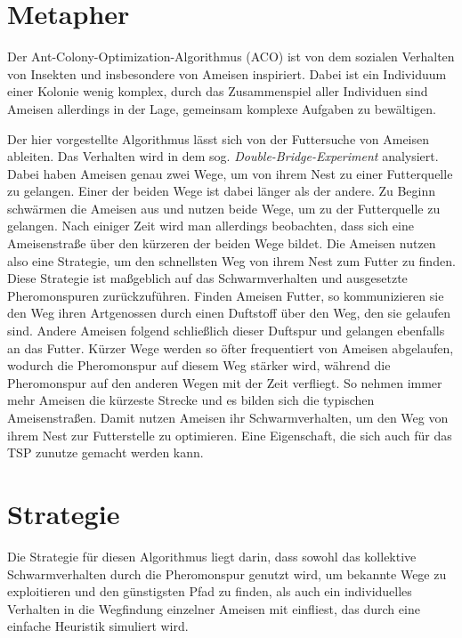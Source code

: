 
\section{Metapher}

Der Ant-Colony-Optimization-Algorithmus (ACO) ist von dem sozialen Verhalten
von Insekten und insbesondere von Ameisen inspiriert. Dabei ist ein
Individuum einer Kolonie wenig komplex, durch das Zusammenspiel aller
Individuen sind Ameisen allerdings in der Lage, gemeinsam komplexe Aufgaben
zu bewältigen.

Der hier vorgestellte Algorithmus lässt sich von der Futtersuche von Ameisen
ableiten. Das Verhalten wird in dem sog. \emph{Double-Bridge-Experiment}
analysiert. Dabei haben Ameisen genau zwei Wege, um von ihrem Nest zu einer
Futterquelle zu gelangen. Einer der beiden Wege ist dabei länger als der
andere. Zu Beginn schwärmen die Ameisen aus und nutzen beide Wege, um zu
der Futterquelle zu gelangen. Nach einiger Zeit wird man allerdings
beobachten, dass sich eine Ameisenstraße über den kürzeren der beiden Wege
bildet. Die Ameisen nutzen also eine Strategie, um den schnellsten Weg von
ihrem Nest zum Futter zu finden.
Diese Strategie ist maßgeblich auf das Schwarmverhalten und ausgesetzte
Pheromonspuren zurückzuführen. Finden Ameisen Futter, so kommunizieren sie
den Weg ihren Artgenossen durch einen Duftstoff über den Weg, den sie
gelaufen sind. Andere Ameisen folgend schließlich dieser Duftspur und
gelangen ebenfalls an das Futter. Kürzer Wege werden so öfter frequentiert
von Ameisen abgelaufen, wodurch die Pheromonspur auf diesem Weg stärker wird,
während die Pheromonspur auf den anderen Wegen mit der Zeit verfliegt.
So nehmen immer mehr Ameisen die kürzeste Strecke und es bilden sich die
typischen Ameisenstraßen.
Damit nutzen Ameisen ihr Schwarmverhalten, um den Weg von ihrem Nest zur
Futterstelle zu optimieren. Eine Eigenschaft, die sich auch für das TSP
zunutze gemacht werden kann.

\section{Strategie}

Die Strategie für diesen Algorithmus liegt darin, dass sowohl das kollektive
Schwarmverhalten durch die Pheromonspur genutzt wird, um bekannte Wege zu
exploitieren und den günstigsten Pfad zu finden, als auch ein individuelles
Verhalten in die Wegfindung einzelner Ameisen mit einfliest, das durch eine
einfache Heuristik simuliert wird.

